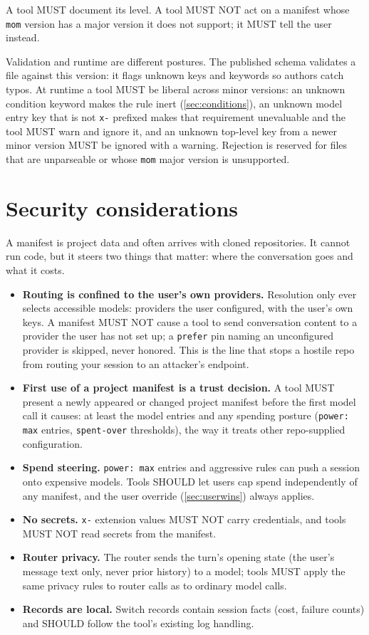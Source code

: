 \documentclass[11pt]{article}
\newcommand{\key}[1]{\texttt{#1}}
\begin{document}
A tool MUST document its level. A tool MUST NOT act on a manifest whose
\key{mom} version has a major version it does not support; it MUST tell the
user instead.

Validation and runtime are different postures. The published schema
validates a file against this version: it flags unknown keys and
keywords so authors catch typos. At runtime a tool MUST be liberal
across minor versions: an unknown condition keyword makes the rule
inert (\ref{sec:conditions}), an unknown model entry key that is not
\key{x-} prefixed makes that requirement unevaluable and the tool MUST warn
and ignore it, and an unknown top-level key from a newer minor version MUST
be ignored with a warning. Rejection is reserved for files that are
unparseable or whose \key{mom} major version is unsupported.

\section{Security considerations}

A manifest is project data and often arrives with cloned repositories.
It cannot run code, but it steers two things that matter: where the
conversation goes and what it costs.

\begin{itemize}
  \item \textbf{Routing is confined to the user's own providers.}
        Resolution only ever selects accessible models: providers the user
        configured, with the user's own keys. A manifest MUST NOT cause a
        tool to send conversation content to a provider the user has not set
        up; a \key{prefer} pin naming an unconfigured provider is skipped,
        never honored. This is the line that stops a hostile repo from
        routing your session to an attacker's endpoint.
  \item \textbf{First use of a project manifest is a trust decision.} A
        tool MUST present a newly appeared or changed project manifest
        before the first model call it causes: at least the model entries
        and any spending posture (\key{power: max} entries,
        \key{spent-over} thresholds), the way it treats other
        repo-supplied configuration.
  \item \textbf{Spend steering.} \key{power: max} entries and aggressive
        rules can push a session onto expensive models. Tools SHOULD let
        users cap spend independently of any manifest, and the user override
        (\ref{sec:userwins}) always applies.
  \item \textbf{No secrets.} \key{x-} extension values MUST NOT carry
        credentials, and tools MUST NOT read secrets from the manifest.
  \item \textbf{Router privacy.} The router sends the turn's opening state
        (the user's message text only, never prior history) to a model;
        tools MUST apply the same privacy rules to router calls as to
        ordinary model calls.
  \item \textbf{Records are local.} Switch records contain session facts
        (cost, failure counts) and SHOULD follow the tool's existing log
        handling.
\end{itemize}
\end{document}
